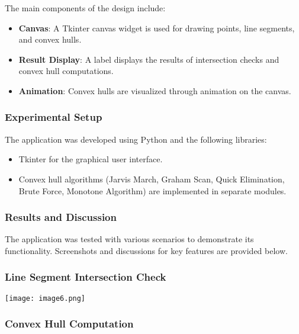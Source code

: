 \documentclass[
]{article}
\begin{document}
The main components of the design include:

\begin{itemize}
\item
  \textbf{Canvas}: A Tkinter canvas widget is used for drawing points,
  line segments, and convex hulls.
\item
  \textbf{Result Display}: A label displays the results of intersection
  checks and convex hull computations.
\item
  \textbf{Animation}: Convex hulls are visualized through animation on
  the canvas.
\end{itemize}

\subsubsection{Experimental Setup}\label{experimental-setup}

The application was developed using Python and the following libraries:

\begin{itemize}
\item
  Tkinter for the graphical user interface.
\item
  Convex hull algorithms (Jarvis March, Graham Scan, Quick Elimination,
  Brute Force, Monotone Algorithm) are implemented in
  separate modules.
\end{itemize}

\subsubsection{Results and Discussion}\label{results-and-discussion}

The application was tested with various scenarios to demonstrate its
functionality. Screenshots and discussions for key features are provided
below.

\subsubsection{Line Segment Intersection
Check}\label{line-segment-intersection-check}

\texttt{[image: image6.png]}

\subsubsection{Convex Hull Computation}\label{convex-hull-computation}
\end{document}
